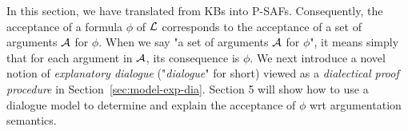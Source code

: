 In this section, we have translated from KBs into P-SAFs. Consequently, the acceptance of a formula $\phi$ of $\mathcal{L}$ corresponds to the acceptance of a set of arguments $\mathcal{A}$ for $\phi$. When we say "a set of arguments $\mathcal{A}$ for $\phi$", it means simply that for each argument in $\mathcal{A}$, its consequence is $\phi$.
We next introduce a novel notion of \textit{explanatory dialogue} ("\emph{dialogue}" for short) viewed as a \emph{dialectical proof procedure} in Section~\ref{sec:model-exp-dia}. Section 5 will show how to use a dialogue model to determine and explain the acceptance of $\phi$ wrt argumentation semantics.



